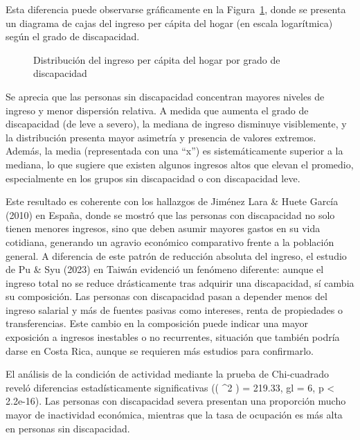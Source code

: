 \documentclass[
  11pt,
  oneside]{article}
\begin{document}
Esta diferencia puede observarse gráficamente en la
Figura~\ref{fig-ingreso}, donde se presenta un diagrama de cajas del
ingreso per cápita del hogar (en escala logarítmica) según el grado de
discapacidad.

\begin{figure}


\caption{\label{fig-ingreso}Distribución del ingreso per cápita del
hogar por grado de discapacidad}

\end{figure}%

Se aprecia que las personas sin discapacidad concentran mayores niveles
de ingreso y menor dispersión relativa. A medida que aumenta el grado de
discapacidad (de leve a severo), la mediana de ingreso disminuye
visiblemente, y la distribución presenta mayor asimetría y presencia de
valores extremos. Además, la media (representada con una ``x'') es
sistemáticamente superior a la mediana, lo que sugiere que existen
algunos ingresos altos que elevan el promedio, especialmente en los
grupos sin discapacidad o con discapacidad leve.

Este resultado es coherente con los hallazgos de Jiménez Lara \& Huete
García (2010) en España, donde se mostró que las personas con
discapacidad no solo tienen menores ingresos, sino que deben asumir
mayores gastos en su vida cotidiana, generando un agravio económico
comparativo frente a la población general. A diferencia de este patrón
de reducción absoluta del ingreso, el estudio de Pu \& Syu (2023) en
Taiwán evidenció un fenómeno diferente: aunque el ingreso total no se
reduce drásticamente tras adquirir una discapacidad, sí cambia su
composición. Las personas con discapacidad pasan a depender menos del
ingreso salarial y más de fuentes pasivas como intereses, renta de
propiedades o transferencias. Este cambio en la composición puede
indicar una mayor exposición a ingresos inestables o no recurrentes,
situación que también podría darse en Costa Rica, aunque se requieren
más estudios para confirmarlo.

El análisis de la condición de actividad mediante la prueba de
Chi-cuadrado reveló diferencias estadísticamente significativas ((
\chi\^{}2 ) = 219.33, gl = 6, p \textless{} 2.2e-16). Las personas con
discapacidad severa presentan una proporción mucho mayor de inactividad
económica, mientras que la tasa de ocupación es más alta en personas sin
discapacidad.
\end{document}
